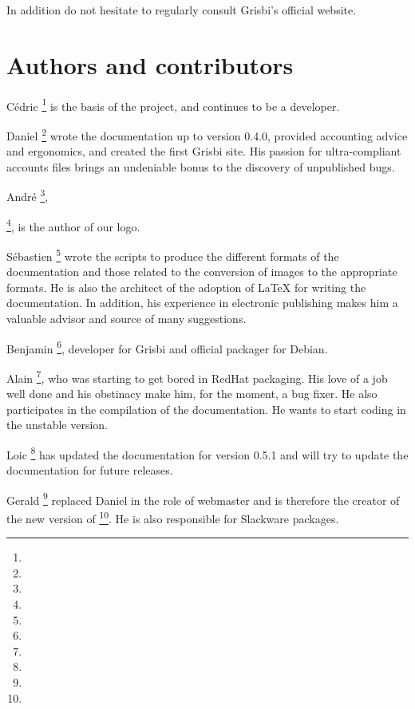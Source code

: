 In addition do not hesitate to regularly consult Grisbi's official website.



\section{Authors and contributors\label{introduction-authors}}

{Cédric }\footnote{\urlCedricAugerEmail{}} is the basis of the project, and continues to be a developer.

{Daniel }\footnote{\urlDanielCartronEmail{}} wrote the documentation up to version 0.4.0, provided accounting advice and ergonomics, and created the first Grisbi site. His passion for ultra-compliant accounts files brings an undeniable bonus to the discovery of unpublished bugs.

{André }\footnote{\urlAndrePascualEmail{}},

\footnote{\urlLinuxGraphic{}}, is the author of our logo.

{Sébastien }\footnote{\urlSebastienBlondeelEmail{}} wrote the scripts to produce the different formats of the documentation and those related to the conversion of images to the appropriate formats. He is also the architect of the adoption of \gls{LaTeX} for writing the documentation. In addition, his experience in electronic publishing makes him a valuable advisor and source of many suggestions.

{Benjamin }\footnote{\urlBenjaminDrieuEmail{}}, developer for Grisbi and official packager for \gls{Debian}.

{Alain }\footnote{\urlDionysosEmail{}}, who was starting to get bored in \gls{RedHat} packaging. His love of a job well done and his obstinacy make him, for the moment, a bug fixer. He also participates in the compilation of the documentation. He wants to start coding in the unstable version.

{Loic }\footnote{\urlLoicBreillouxEmail{}} has updated the documentation for version 0.5.1 and will try to update the documentation for future releases.

{Gerald }\footnote{\urlGeraldNielEmail{}} replaced {Daniel } in the role of webmaster and is therefore the creator of the new version of \footnote{\urlGrisbi{}}. He is also responsible for \gls{Slackware} packages.

